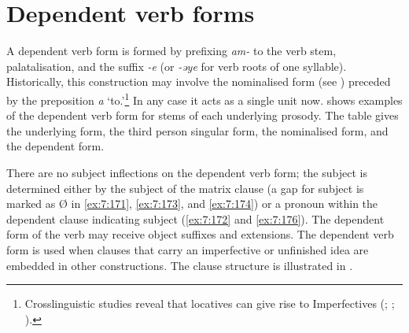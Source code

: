 \section{Dependent verb forms}\label{sec:7.7}
\hypertarget{RefHeading1212481525720847}{}
A dependent verb form is formed by prefixing \textit{am-} to the verb stem, palatalisation, and the suffix \textit{{}-e} (or \textit{{}-əye} for verb roots of one syllable). Historically, this construction may involve the nominalised form (see ) preceded by the preposition \textit{a} ‘to.’\footnote{Crosslinguistic studies reveal that locatives can give rise to Imperfectives (\citealt[103]{Comrie1976}; \citealt[142]{BybeeEtAl1994}; \citealt[99]{HeineKuteva2002}).} In any case it acts as a single unit now.  shows examples of the dependent verb form for stems of each underlying prosody. The table gives the underlying form, the third person singular form, the nominalised form, and the dependent form. 

\begin{table}
\caption{Dependent verb forms\label{tab:69}}
\end{table}

There are no subject inflections on the dependent verb form; the subject is determined either by the subject of the matrix clause (a gap for subject is marked as Ø in \ref{ex:7:171}, \ref{ex:7:173}, and \ref{ex:7:174}) or a pronoun within the dependent clause indicating subject (\ref{ex:7:172} and \ref{ex:7:176}). The dependent form of the verb may receive object suffixes and extensions.  The dependent verb form is used when clauses that carry an imperfective or unfinished idea are embedded in other constructions. The clause structure is illustrated in .
\clearpage

